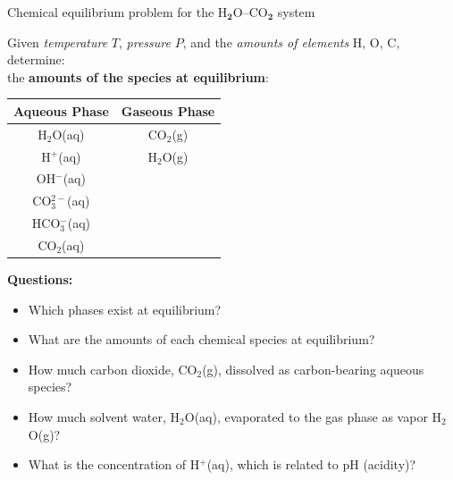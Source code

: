 \begin{frame}[<+->]{Chemical equilibrium problem for the H$_{\boldsymbol{2}}$O–CO$_{\boldsymbol{2}}$
system}

\lcol

Given \emph{temperature} $T$, \emph{pressure} $P$, and the \emph{amounts
of elements} H, O, C, determine: \\
the \textbf{amounts of the species at equilibrium}:
\begin{center}
\begin{tabular}{cc}
\toprule 
\multicolumn{1}{c}{\textbf{Aqueous Phase}} & \multicolumn{1}{c}{\textbf{Gaseous Phase}}\tabularnewline
\midrule
H$_{2}$O(aq) & CO$_{2}$(g)\tabularnewline
H$^{+}$(aq) & H$_{2}$O(g)\tabularnewline
OH$^{-}$(aq) & \tabularnewline
CO$_{3}^{2-}$(aq) & \tabularnewline
HCO$_{3}^{-}$(aq) & \tabularnewline
CO$_{2}$(aq) & \tabularnewline
\bottomrule
\end{tabular} 
\par\end{center}

\rcol
\vskip 5pt
\alert{\textbf{Questions:}}
\begin{itemize}
\item Which phases exist at equilibrium? 
\item What are the amounts of each chemical species at equilibrium? 
\item How much carbon dioxide, CO$_{2}$(g), dissolved as carbon-bearing
aqueous species? 
\item How much solvent water, H$_{2}$O(aq), evaporated to the gas phase
as vapor H$_{2}$O(g)? 
\item What is the concentration of H$^{+}$(aq), which is related to pH
(acidity)?
\end{itemize}
\ecol
\end{frame}
%
%
